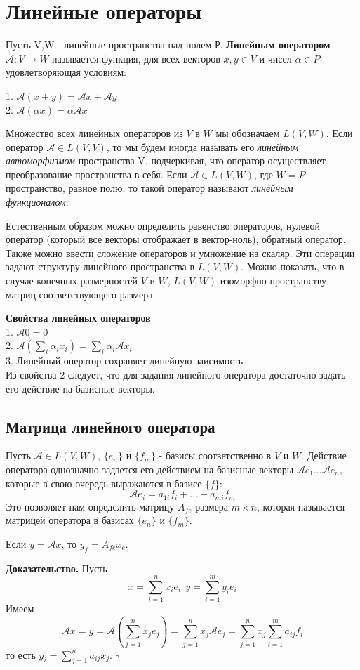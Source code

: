 \newpage
\section{Линейные операторы}
\begin{defin}
Пусть V,W - линейные пространства над полем Р. \textbf{Линейным оператором}
$\mathcal A\colon V\to W$ называется функция, для всех векторов $x,y\in V$ и 
чисел $\alpha\in P$ удовлетворяющая условиям:
\end{defin}
1. $\mathcal A(x+y)=\mathcal Ax+\mathcal Ay$\\
2. $\mathcal A(\alpha x)=\alpha\mathcal Ax$

Множество всех линейных операторов из $V$ в $W$ мы обозначаем $L(V,W)$. Если
оператор $\mathcal A\in L(V,V)$, то мы будем иногда называть его 
\textit{линейным автоморфизмом} пространства V, подчеркивая, что оператор 
осуществляет преобразование пространства в себя. Если $\mathcal A\in L(V,W)$,
где $W=P$ - пространство, равное полю, то такой оператор называют 
\textit{линейным функционалом}.

Естественным образом можно определить равенство операторов, нулевой оператор
(который все векторы отображает в вектор-ноль), обратный оператор. Также
можно ввести сложение операторов и умножение на скаляр. Эти операции задают
структуру линейного пространства в $L(V,W)$. Можно показать, что в случае 
конечных размерностей $V$ и $W$, $L(V,W)$ изоморфно пространству матриц 
соответствующего размера. 

\textbf{Свойства линейных операторов}\\
1. $\mathcal A0=0$\\
2. $\mathcal A(\sum\limits_i\alpha_ix_i)=\sum\limits_i\alpha_i\mathcal Ax_i$\\
3. Линейный оператор сохраняет линейную заисимость.\\
Из свойства 2 следует, что для задания линейного оператора достаточно задать
его действие на базисные векторы. 


\subsection{Матрица линейного оператора}
Пусть $\mathcal A\in L(V,W)$, $\{e_n\}$ и $\{f_m\}$ - базисы соответственно
в $V$ и $W$. Действие оператора однозначно задается его действием на
базисные векторы $\mathcal Ae_1...\mathcal Ae_n$, которые в свою очередь 
выражаются в базисе $\{f\}$:
$$\mathcal Ae_i=a_{1i}f_i+...+a_{mi}f_m$$
Это позволяет нам определить матрицу $A_{fe}$ размера $m\times n$, которая
называется матрицей оператора в базисах $\{e_n\}$ и $\{f_m\}$.
\begin{theor}
Если $y=\mathcal Ax$, то $y_f=A_{fe}x_e$.
\end{theor}
\textbf{Доказательство.} Пусть $$x=\sum\limits_{i=1}^nx_ie_i~~y=\sum\limits_
{i=1}^my_ie_i$$
Имеем $$\mathcal Ax=y=\mathcal A(\sum\limits_{j=1}^nx_je_j)=\sum\limits_{j=1}
^nx_j\mathcal Ae_j=\sum\limits_{j=1}^nx_j\sum\limits_{i=1}^ma_{ij}f_i $$
то есть $y_i=\sum\limits_{j=1}^na_{ij}x_j$. $\square$

